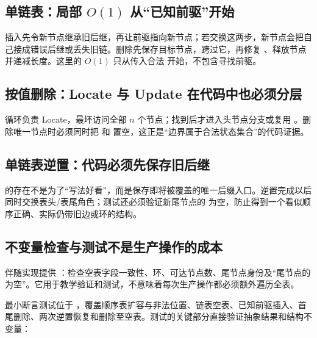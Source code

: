 \documentclass[UTF8,fontset=none,11pt,a4paper]{ctexart}
\begin{document}
\subsection{单链表：局部 \texorpdfstring{$O(1)$}{O(1)} 从“已知前驱”开始}


插入先令新节点继承旧后继，再让前驱指向新节点；若交换这两步，新节点会把自己接成错误后继或丢失旧链。删除先保存目标节点，跨过它，再修复 、释放节点并递减长度。这里的 $O(1)$ 只从传入合法  开始，不包含寻找前驱。

\subsection{按值删除：Locate 与 Update 在代码中也必须分层}


循环负责 Locate，最坏访问全部 $n$ 个节点；找到后才进入头节点分支或复用 。删除唯一节点时必须同时把  和  置空，这正是“边界属于合法状态集合”的代码证据。

\subsection{单链表逆置：代码必须先保存旧后继}


 的存在不是为了“写法好看”，而是保存即将被覆盖的唯一后缀入口。逆置完成以后同时交换表头/表尾角色；测试还必须验证新尾节点的  为空，防止得到一个看似顺序正确、实际仍带旧边或环的结构。

\subsection{不变量检查与测试不是生产操作的成本}
伴随实现提供 ：检查空表字段一致性、环、可达节点数、尾节点身份及“尾节点的  为空”。它用于教学验证和测试，不意味着每次生产操作都必须额外遍历全表。

最小断言测试位于 ，覆盖顺序表扩容与非法位置、链表空表、已知前驱插入、首尾删除、两次逆置恢复和删除至空表。测试的关键部分直接验证抽象结果和结构不变量：

\end{document}
